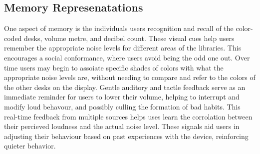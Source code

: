 \newpage
\subsection{Memory Represenatations}

One aspect of memory is the individuals users recognition and recall of the color-coded desks, volume metre, and decibel count. These visual cues help users remember the appropriate noise levels for different areas of the libraries. This encourages a social conformance, where users avoid being the odd one out. Over time users may begin to assoiate specific shades of colors with what the appropriate noise levels are, without needing to compare and refer to the colors of the other desks on the display. Gentle auditory and tactle feedback serve as an immediate reminder for users to lower their volume, helping to interrupt and modify loud behavour, and possibly culling the formation of bad habits. This real-time feedback from multiple sources helps uses learn the corrolation between their percieved loudness and the actual noise level. These signals aid users in adjusting their behaviour based on past experiences with the device, reinforcing quieter behavior.

